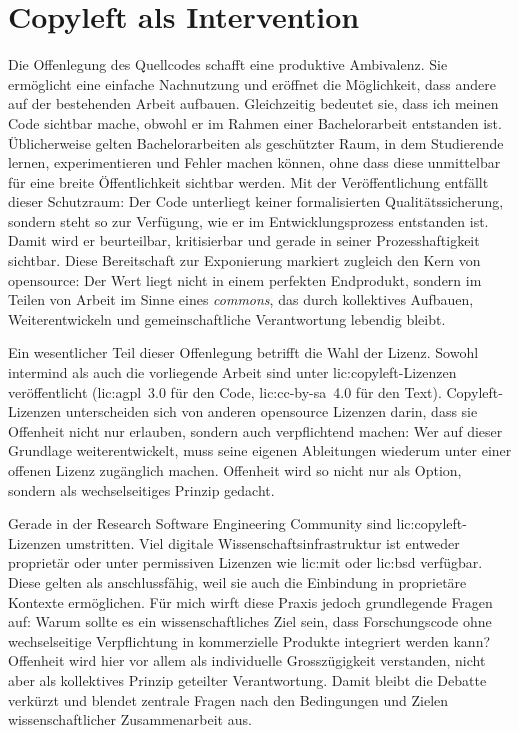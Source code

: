 \section{Copyleft als Intervention}

Die Offenlegung des Quellcodes schafft eine produktive Ambivalenz. Sie ermöglicht eine einfache Nachnutzung und eröffnet die Möglichkeit, dass andere auf der bestehenden Arbeit aufbauen. Gleichzeitig bedeutet sie, dass ich meinen Code sichtbar mache, obwohl er im Rahmen einer Bachelorarbeit entstanden ist. Üblicherweise gelten Bachelorarbeiten als geschützter Raum, in dem Studierende lernen, experimentieren und Fehler machen können, ohne dass diese unmittelbar für eine breite Öffentlichkeit sichtbar werden. Mit der Veröffentlichung entfällt dieser Schutzraum: Der Code unterliegt keiner formalisierten Qualitätssicherung, sondern steht so zur Verfügung, wie er im Entwicklungsprozess entstanden ist. Damit wird er beurteilbar, kritisierbar und gerade in seiner Prozesshaftigkeit sichtbar. Diese Bereitschaft zur Exponierung markiert zugleich den Kern von \gls{opensource}: Der Wert liegt nicht in einem perfekten Endprodukt, sondern im Teilen von Arbeit im Sinne eines \emph{commons}, das durch kollektives Aufbauen, Weiterentwickeln und gemeinschaftliche Verantwortung lebendig bleibt.

Ein wesentlicher Teil dieser Offenlegung betrifft die Wahl der Lizenz. Sowohl \gls{intermind} als auch die vorliegende Arbeit sind unter \gls{lic:copyleft}-Lizenzen veröffentlicht (\gls{lic:agpl}~3.0 für den Code, \gls{lic:cc-by-sa}~4.0 für den Text). Copyleft-Lizenzen unterscheiden sich von anderen \gls{opensource} Lizenzen darin, dass sie Offenheit nicht nur erlauben, sondern auch verpflichtend machen: Wer auf dieser Grundlage weiterentwickelt, muss seine eigenen Ableitungen wiederum unter einer offenen Lizenz zugänglich machen. Offenheit wird so nicht nur als Option, sondern als wechselseitiges Prinzip gedacht. 

Gerade in der Research Software Engineering Community sind \gls{lic:copyleft}-Lizenzen umstritten. Viel digitale Wissenschaftsinfrastruktur ist entweder proprietär oder unter permissiven Lizenzen wie \gls{lic:mit} oder \gls{lic:bsd} \parencite{sethiWhyEarthAre2020} verfügbar. Diese gelten als anschlussfähig, weil sie auch die Einbindung in proprietäre Kontexte ermöglichen. Für mich wirft diese Praxis jedoch grundlegende Fragen auf: Warum sollte es ein wissenschaftliches Ziel sein, dass Forschungscode ohne wechselseitige Verpflichtung in kommerzielle Produkte integriert werden kann? Offenheit wird hier vor allem als individuelle Grosszügigkeit verstanden, nicht aber als kollektives Prinzip geteilter Verantwortung. Damit bleibt die Debatte verkürzt und blendet zentrale Fragen nach den Bedingungen und Zielen wissenschaftlicher Zusammenarbeit aus.

